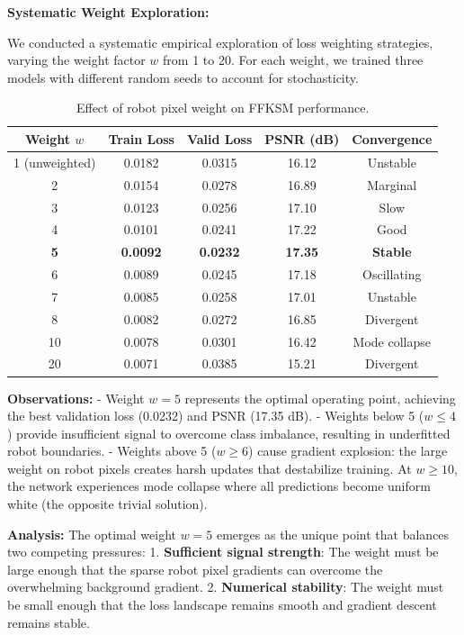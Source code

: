 \documentclass[12pt,a4paper,oneside]{report}
\begin{document}
\textbf{Systematic Weight Exploration:}

We conducted a systematic empirical exploration of loss weighting strategies, varying the weight factor $w$ from 1 to 20. For each weight, we trained three models with different random seeds to account for stochasticity.

\begin{table}[H]
\centering
\caption{Effect of robot pixel weight on FFKSM performance.}
\label{tab:weight_tuning}
\begin{tabular}{ccccc}
\toprule
Weight $w$ & Train Loss & Valid Loss & PSNR (dB) & Convergence \\
\midrule
1 (unweighted) & 0.0182 & 0.0315 & 16.12 & Unstable \\
2 & 0.0154 & 0.0278 & 16.89 & Marginal \\
3 & 0.0123 & 0.0256 & 17.10 & Slow \\
4 & 0.0101 & 0.0241 & 17.22 & Good \\
\textbf{5} & \textbf{0.0092} & \textbf{0.0232} & \textbf{17.35} & \textbf{Stable} \\
6 & 0.0089 & 0.0245 & 17.18 & Oscillating \\
7 & 0.0085 & 0.0258 & 17.01 & Unstable \\
8 & 0.0082 & 0.0272 & 16.85 & Divergent \\
10 & 0.0078 & 0.0301 & 16.42 & Mode collapse \\
20 & 0.0071 & 0.0385 & 15.21 & Divergent \\
\bottomrule
\end{tabular}
\end{table}

\textbf{Observations:}
- Weight $w = 5$ represents the optimal operating point, achieving the best validation loss (0.0232) and PSNR (17.35 dB).
- Weights below 5 ($w \leq 4$) provide insufficient signal to overcome class imbalance, resulting in underfitted robot boundaries.
- Weights above 5 ($w \geq 6$) cause gradient explosion: the large weight on robot pixels creates harsh updates that destabilize training. At $w \geq 10$, the network experiences mode collapse where all predictions become uniform white (the opposite trivial solution).

\textbf{Analysis:} The optimal weight $w = 5$ emerges as the unique point that balances two competing pressures:
1. \textbf{Sufficient signal strength}: The weight must be large enough that the sparse robot pixel gradients can overcome the overwhelming background gradient.
2. \textbf{Numerical stability}: The weight must be small enough that the loss landscape remains smooth and gradient descent remains stable.
\end{document}
